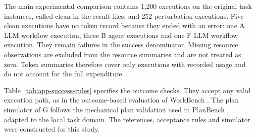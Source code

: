\endgroup

The main experimental comparison contains 1,200 executions on the original task instances, called clean in the result files, and 252 perturbation executions. Five clean executions have no token record because they ended with an error: one A LLM workflow execution, three B agent executions and one F LLM workflow execution. They remain failures in the success denominator. Missing resource observations are excluded from the resource summaries and are not treated as zero. Token summaries therefore cover only executions with recorded usage and do not account for the full expenditure.

Table~\ref{tab:app-success-rules} specifies the outcome checks. They accept any valid execution path, as in the outcome-based evaluation of WorkBench \parencite{stylesWorkBenchBenchmarkDataset2024}. The plan simulator of G follows the mechanical plan validation used in PlanBench \parencite{valmeekamPlanBenchExtensibleBenchmark2022}, adapted to the local task domain. The references, acceptance rules and simulator were constructed for this study.

